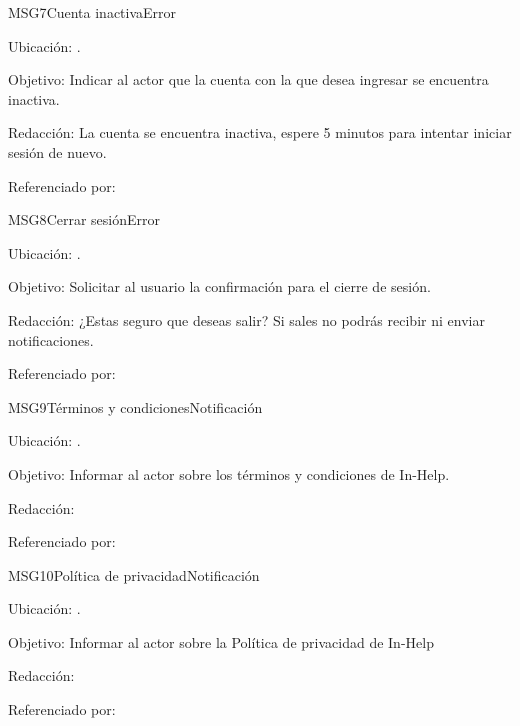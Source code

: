 \begin{mensaje}{MSG7}{Cuenta inactiva}{Error}
	\item[Ubicación:] \msjEmergente.
	\item[Objetivo:] Indicar al actor que la cuenta con la que desea ingresar se encuentra inactiva.
	\item[Redacción:] La cuenta se encuentra inactiva, espere 5 minutos para intentar iniciar sesión de nuevo.
	\item[Referenciado por:] 
\end{mensaje}


\begin{mensaje}{MSG8}{Cerrar sesión}{Error}
	\item[Ubicación:] \msjEmergente.
	\item[Objetivo:] Solicitar al usuario la confirmación para el cierre de sesión.
	\item[Redacción:] ¿Estas seguro que deseas salir? Si sales no podrás recibir ni enviar notificaciones.
	\item[Referenciado por:] 
\end{mensaje}


\begin{mensaje}{MSG9}{Términos y condiciones}{Notificación}
	\item[Ubicación:] \msjEmergente.
	\item[Objetivo:] Informar al actor sobre los términos y condiciones de In-Help.
	\item[Redacción:] 
	\item[Referenciado por:] 
\end{mensaje}


\begin{mensaje}{MSG10}{Política de privacidad}{Notificación}
	\item[Ubicación:] \msjEmergente.
	\item[Objetivo:] Informar al actor sobre la Política de privacidad de In-Help
	\item[Redacción:]
	\item[Referenciado por:] 
\end{mensaje}


